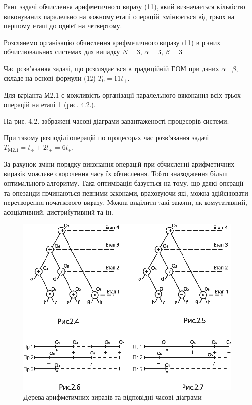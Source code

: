 \documentclass[
	a4paper,
	oneside,
	BCOR = 10mm,
	DIV = 12,
	12pt,
	headings = normal,
]{scrartcl}
\begin{document}
		Ранг задачі обчислення арифметичного виразу (11), який визначається кількістю виконуваних паралельно на кожному етапі операцій, змінюється від трьох на першому етапі до однієї на четвертому.

		Розглянемо організацію обчислення арифметичного виразу (11) в різних обчислювальних системах для випадку $N = 3$, $\alpha = 3$, $\beta = 3$.

		Час розв’язання задачі, що розглядається в традиційній ЕОМ при даних $\alpha$ і $\beta$, складе на основі формули (12) $T_0 = 11 t_{+}$.

		Для варіанта М2.1 є можливість організації паралельного виконання всіх трьох операцій на етапі 1 (рис. 4.2.).

		На рис. 4.2. зображені часові діаграми завантаженості процесорів системи.

		При такому розподілі операцій по процесорах час розв’язання задачі $T_{\text{M2.1}} = t_{\div} + 2 t_{+} = 6 t_{+}$.

		За рахунок зміни порядку виконання операцій при обчисленні арифметичних виразів можливе скорочення часу їх обчислення. Тобто знаходження більш оптимального алгоритму. Така оптимізація базується на тому, що деякі операції та операнди починаються певними законами, враховуючи які, можна здійснювати перетворення початкового виразу. Можна виділити такі закони, як комутативний, асоціативний, дистрибутивний та ін.

		\begin{figure}[!htbp]
			\centering
			\includegraphics[height = 18\baselineskip]{./assets/01.png}
			\caption{Дерева арифметичних виразів та відповідні часові діаграми}
			\label{fig:expr-trees-time-diags}
		\end{figure}
\end{document}
